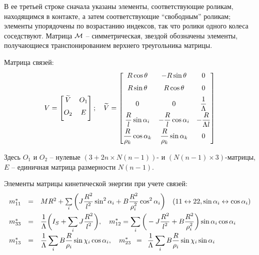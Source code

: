 В ее третьей строке сначала указаны элементы, соответствующие роликам, находящимся в контакте, а затем соответствующие ``свободным'' роликам; элементы упорядочены по возрастанию индексов, так что ролики одного колеса соседствуют. Матрица $\mathcal{M}$ -- симметрическая, звездой обозначены элементы, получающиеся транспонированием верхнего треугольника матрицы.

Матрица связей:
$$
V = \begin{bmatrix}
        \widetilde{V}  & O_1  \\[6pt]
        O_2       & E         \\[6pt]
    \end{bmatrix};
\quad
\widetilde{V} = \begin{bmatrix}
        R\cos\theta                    & -R\sin\theta                    & 0                      \\[6pt]
        R\sin\theta                    &  R\cos\theta                    & 0                      \\[6pt]
        0                              & 0                               & \displaystyle\frac{\displaystyle 1}{\displaystyle \Lambda}    \\[6pt]
        \displaystyle\frac{\displaystyle R}{\displaystyle l}\sin\alpha_i      & -\displaystyle\frac{\displaystyle R}{\displaystyle l}\cos\alpha_i      & -\displaystyle\frac{\displaystyle R}{\displaystyle \Lambda l} \\[6pt]
        \displaystyle\frac{\displaystyle R}{\displaystyle \rho_k}\cos\alpha_k &  \displaystyle\frac{\displaystyle R}{\displaystyle \rho_k}\sin\alpha_k & 0                      \\[6pt]
    \end{bmatrix}
$$

Здесь $O_1$ и $O_2$ -- нулевые $(3+2n \times N(n-1))$- и $(N(n-1) \times 3)$-матрицы, $E$ -- единичная матрица размерности $N(n-1)$.

Элементы матрицы кинетической энергии при учете связей:
\begin{equation}\label{mstar}
    \begin{array}{rcl}
        m^*_{11} & = & MR^2 + \sum\limits_i \bigg( J\ddfrac{R^2}{l^2}\sin^2\alpha_i + B\ddfrac{R^2}{\rho_i^2}\cos^2\alpha_i\bigg)\quad(11 \leftrightarrow 22, \sin\alpha_i \leftrightarrow \cos\alpha_i)\vsp
        m^*_{33} & = & \ddfrac{1}{\Lambda}\bigg(I_S + \sum\limits_i J\ddfrac{R^2}{l^2}\bigg),\quad
        m^*_{12}  =  \sum\limits_i \bigg(-J\ddfrac{R^2}{l^2} + B\ddfrac{R^2}{\rho_i^2}\bigg)\sin\alpha_i\cos\alpha_i\vsp
        m^*_{13} & = & \ddfrac{1}{\Lambda}\sum\limits_i B\ddfrac{R}{\rho_i}\sin\chi_i\cos\alpha_i,
        \quad
        m^*_{23} \enspace = \enspace \ddfrac{1}{\Lambda}\sum\limits_i B\ddfrac{R}{\rho_i}\sin\chi_i\sin\alpha_i
    \end{array}
\end{equation}


